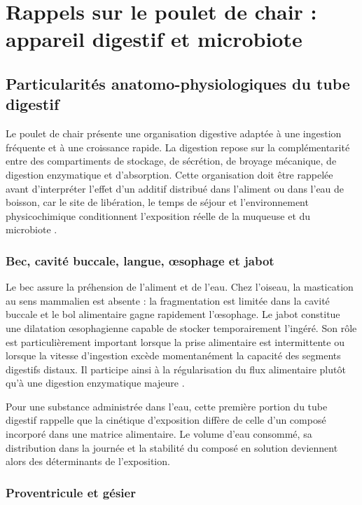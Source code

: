 \section{Rappels sur le poulet de chair : appareil digestif et microbiote}

\subsection{Particularités anatomo-physiologiques du tube digestif}

Le poulet de chair présente une organisation digestive adaptée à une ingestion fréquente et à une croissance rapide. La digestion repose sur la complémentarité entre des compartiments de stockage, de sécrétion, de broyage mécanique, de digestion enzymatique et d'absorption. Cette organisation doit être rappelée avant d'interpréter l'effet d'un additif distribué dans l'aliment ou dans l'eau de boisson, car le site de libération, le temps de séjour et l'environnement physicochimique conditionnent l'exposition réelle de la muqueuse et du microbiote \citep{Svihus2014,RavindranAbdollahi2021}.

\subsubsection{Bec, cavité buccale, langue, œsophage et jabot}

Le bec assure la préhension de l'aliment et de l'eau. Chez l'oiseau, la mastication au sens mammalien est absente : la fragmentation est limitée dans la cavité buccale et le bol alimentaire gagne rapidement l'œsophage. Le jabot constitue une dilatation œsophagienne capable de stocker temporairement l'ingéré. Son rôle est particulièrement important lorsque la prise alimentaire est intermittente ou lorsque la vitesse d'ingestion excède momentanément la capacité des segments digestifs distaux. Il participe ainsi à la régularisation du flux alimentaire plutôt qu'à une digestion enzymatique majeure \citep{Svihus2014}.

Pour une substance administrée dans l'eau, cette première portion du tube digestif rappelle que la cinétique d'exposition diffère de celle d'un composé incorporé dans une matrice alimentaire. Le volume d'eau consommé, sa distribution dans la journée et la stabilité du composé en solution deviennent alors des déterminants de l'exposition.

\subsubsection{Proventricule et gésier}

